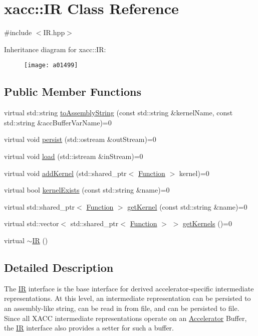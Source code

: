 \hypertarget{a01499}{}\section{xacc\+:\+:IR Class Reference}
\label{a01499}


{\ttfamily \#include $<$I\+R.\+hpp$>$}

Inheritance diagram for xacc\+:\+:IR\+:\begin{figure}[H]
\begin{center}
\leavevmode
\texttt{[image: a01499]}
\end{center}
\end{figure}
\subsection*{Public Member Functions}
\begin{DoxyCompactItemize}
\item 
virtual std\+::string \hyperlink{a01499_a8356cdff1919b88eabeb84fd7450cdb6}{to\+Assembly\+String} (const std\+::string \&kernel\+Name, const std\+::string \&acc\+Buffer\+Var\+Name)=0
\item 
virtual void \hyperlink{a01499_a414b72224d88473ad6190bb88102a3ea}{persist} (std\+::ostream \&out\+Stream)=0
\item 
virtual void \hyperlink{a01499_a444c2e4dc0faac500fb70fa93997e9bc}{load} (std\+::istream \&in\+Stream)=0
\item 
virtual void \hyperlink{a01499_abbbf8e6993c518597de32cd05d49d737}{add\+Kernel} (std\+::shared\+\_\+ptr$<$ \hyperlink{a01475}{Function} $>$ kernel)=0
\item 
virtual bool \hyperlink{a01499_afc9ccf5126f3fed19c2e879133b2f6d8}{kernel\+Exists} (const std\+::string \&name)=0
\item 
virtual std\+::shared\+\_\+ptr$<$ \hyperlink{a01475}{Function} $>$ \hyperlink{a01499_a6f49b4ba4b3a15142b04873284885f0d}{get\+Kernel} (const std\+::string \&name)=0
\item 
virtual std\+::vector$<$ std\+::shared\+\_\+ptr$<$ \hyperlink{a01475}{Function} $>$ $>$ \hyperlink{a01499_a88c50bfc5b279145360ddc0c3a703b9b}{get\+Kernels} ()=0
\item 
virtual \hyperlink{a01499_a09a76d71092254acae07e19fa2f34921}{$\sim$\+IR} ()
\end{DoxyCompactItemize}


\subsection{Detailed Description}
The \hyperlink{a01499}{IR} interface is the base interface for derived accelerator-\/specific intermediate representations. At this level, an intermediate representation can be persisted to an assembly-\/like string, can be read in from file, and can be persisted to file. Since all X\+A\+CC intermediate representations operate on an \hyperlink{a01435}{Accelerator} Buffer, the \hyperlink{a01499}{IR} interface also provides a setter for such a buffer. 

